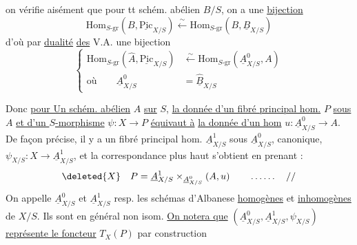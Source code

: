 on vérifie aisément que pour tt schém. abélien $B/S$, on
a une \uline{bijection}
\[
\mathrm{Hom}_{S\text{-gr}}(B,\underline{\mathrm{Pic}}_{X/S})\xleftarrow{\sim}\mathrm{Hom}_{S\text{-gr}}(B,\underline B_{X/S})
\]
d'où par \uline{dualité} \uline{des} V.A. une bijection
\[
\left\{\begin{aligned}
\mathrm{Hom}_{S\text{-gr}}(\widehat A,\underline{\mathrm{Pic}}_{X/S})&\xleftarrow{\sim}\mathrm{Hom}_{S\text{-gr}}(\underline A^0_{X/S},A)\\
\text{où}\qquad \underline A^0_{X/S}&=\widehat{\underline B}_{X/S}
\end{aligned}\right.
\]

Donc \uline{pour Un schém. abélien} $A$ \uline{sur} $S$, 
\uline{la donnée d'un fibré principal hom.} $P$ \uline{sous} $A$
\uline{et d'un $S$-morphisme} $\psi:X\longrightarrow P$ \uline{équivaut  à}
\uline{la donnée d'un hom}  $u:\underline A^0_{X/S}\longrightarrow A$. De façon
précise, il y a un fibré principal hom.
$\underline A^1_{X/S}$ sous $\underline A^0_{X/S}$, canonique,  
  $\psi_{X/S}:X\longrightarrow\underline A^1_{X/S}$, et la correspondance
 plus haut s'obtient en prenant :
\[
\deleted{X} \quad P=\underline A^1_{X/S}\times_{\underline A^0_{X/S}}(A,u)\qquad \ldots\ldots\quad //
\]
On appelle
$\underline A^0_{X/S}$ et $\underline A^1_{X/S}$ resp. les schémas d'Albanese
\uline{homogènes} et \uline{inhomogènes} de $X/S$. Ils sont
en général non isom. \uline{On notera que}
$(\underline A^0_{X/S},\underline A^1_{X/S},\psi_{X/S})$ \uline{représente le foncteur} $T_X(P)$ par construction
